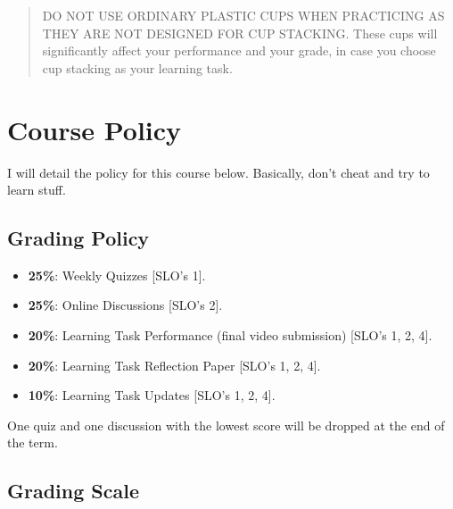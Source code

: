 \documentclass[
  letterpaper,
  DIV=11,
  numbers=noendperiod,
  oneside]{scrartcl}
\begin{document}
\begin{quote}
DO NOT USE ORDINARY PLASTIC CUPS WHEN PRACTICING AS THEY ARE NOT
DESIGNED FOR CUP STACKING. These cups will significantly affect your
performance and your grade, in case you choose cup stacking as your
learning task.
\end{quote}

\hypertarget{course-policy}{%
\section{Course Policy}\label{course-policy}}

I will detail the policy for this course below. Basically, don't cheat
and try to learn stuff.

\hypertarget{grading-policy}{%
\subsection{Grading Policy}\label{grading-policy}}

\begin{itemize}
\item
  \textbf{25\%}: Weekly Quizzes {[}SLO's 1{]}.
\item
  \textbf{25\%}: Online Discussions {[}SLO's 2{]}.
\item
  \textbf{20\%}: Learning Task Performance (final video submission)
  {[}SLO's 1, 2, 4{]}.
\item
  \textbf{20\%}: Learning Task Reflection Paper {[}SLO's 1, 2, 4{]}.
\item
  \textbf{10\%}: Learning Task Updates {[}SLO's 1, 2, 4{]}.
\end{itemize}

\begin{tcolorbox}[enhanced jigsaw, breakable, colbacktitle=quarto-callout-note-color!10!white, colframe=quarto-callout-note-color-frame, opacitybacktitle=0.6, title=\textcolor{quarto-callout-note-color}{\faInfo}\hspace{0.5em}{Note}, opacityback=0, colback=white, bottomrule=.15mm, toprule=.15mm, left=2mm, rightrule=.15mm, toptitle=1mm, titlerule=0mm, arc=.35mm, bottomtitle=1mm, leftrule=.75mm, coltitle=black]
One quiz and one discussion with the lowest score will be dropped at the
end of the term.
\end{tcolorbox}

\hypertarget{grading-scale}{%
\subsection{Grading Scale}\label{grading-scale}}
\end{document}
